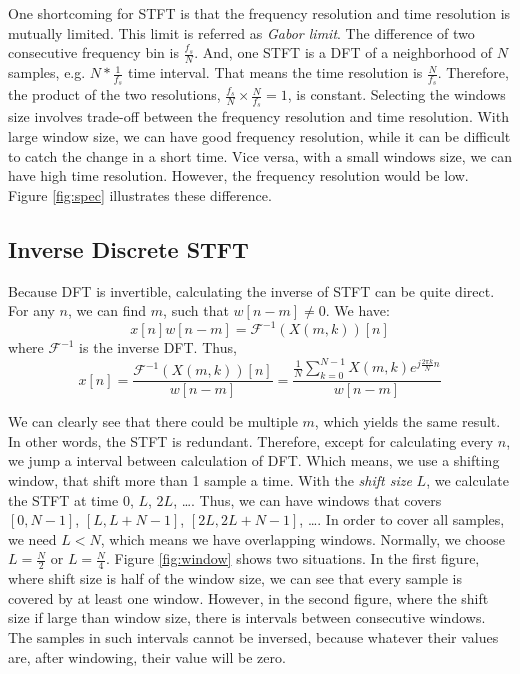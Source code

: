 \documentclass[11pt,a4paper]{report}
\begin{document}
One shortcoming for STFT is that the frequency resolution and time resolution is mutually limited. This limit is referred as \textit{Gabor limit}. The difference of two consecutive frequency bin is $\frac{f_s}{N}$. And, one STFT is a DFT of a neighborhood of $N$ samples, e.g. $N * \frac{1}{f_s}$ time interval. That means the time resolution is $\frac{N}{f_s}$. Therefore, the product of the two resolutions, $\frac{f_s}{N} \times \frac{N}{f_s} = 1$, is constant. Selecting the windows size involves trade-off between the frequency resolution and time resolution. With large window size, we can have good frequency resolution, while it can be difficult to catch the change in a short time. Vice versa, with a small windows size, we can have high time resolution. However, the frequency resolution would be low. Figure \ref{fig:spec} illustrates these difference.

\subsection{Inverse Discrete STFT}
Because DFT is invertible, calculating the inverse of STFT can be quite direct. For any $n$, we can find $m$, such that $w[n-m] \neq 0$. We have:
\[ x[n]w[n-m] = \mathcal{F}^{-1}(X(m,k))[n] \]
where $\mathcal{F}^{-1}$ is the inverse DFT. Thus,
\begin{equation}
  x[n] =  \frac{\mathcal{F}^{-1}(X(m,k))[n]}{w[n-m]} = \frac{\frac{1}{N}\sum_{k=0}^{N-1} X(m,k)e^{j \frac{2\pi k}{N} n}}{w[n-m]}
  \label{eq:naiveinv}
\end{equation}

We can clearly see that there could be multiple $m$, which yields the same result. In other words, the STFT is redundant. Therefore, except for calculating every $n$, we jump a interval between calculation of DFT. Which means, we use a shifting window, that shift more than 1 sample a time. With the \textit{shift size} $L$, we calculate the STFT at time $0$, $L$, $2L$, \dots. Thus, we can have windows that covers $[0, N-1]$, $[L, L+N-1]$, $[2L, 2L+N-1]$, \dots. In order to cover all samples, we need $L<N$, which means we have overlapping windows. Normally, we choose $L = \frac{N}{2}$ or $L = \frac{N}{4}$. Figure \ref{fig:window} shows two situations. In the first figure, where shift size is half of the window size, we can see that every sample is covered by at least one window. However, in the second figure, where the shift size if large than window size, there is intervals between consecutive windows. The samples in such intervals cannot be inversed, because whatever their values are, after windowing, their value will be zero. 
\end{document}
